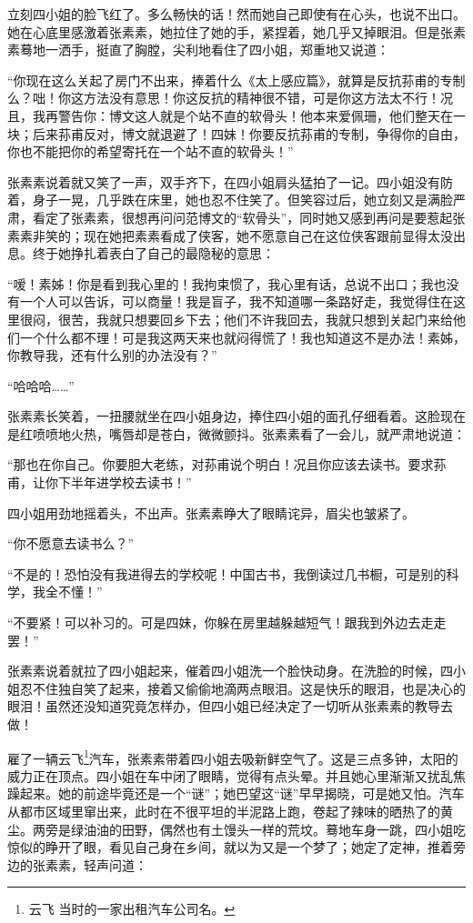 \par 立刻四小姐的脸飞红了。多么畅快的话！然而她自己即使有在心头，也说不出口。她在心底里感激着张素素，她拉住了她的手，紧捏着，她几乎又掉眼泪。但是张素素蓦地一洒手，挺直了胸膛，尖利地看住了四小姐，郑重地又说道：
\par “你现在这么关起了房门不出来，捧着什么《太上感应篇》，就算是反抗荪甫的专制么？咄！你这方法没有意思！你这反抗的精神很不错，可是你这方法太不行！况且，我再警告你：博文这人就是个站不直的软骨头！他本来爱佩珊，他们整天在一块；后来荪甫反对，博文就退避了！四妹！你要反抗荪甫的专制，争得你的自由，你也不能把你的希望寄托在一个站不直的软骨头！”
\par 张素素说着就又笑了一声，双手齐下，在四小姐肩头猛拍了一记。四小姐没有防着，身子一晃，几乎跌在床里，她也忍不住笑了。但笑容过后，她立刻又是满脸严肃，看定了张素素，很想再问问范博文的“软骨头”，同时她又感到再问是要惹起张素素非笑的；现在她把素素看成了侠客，她不愿意自己在这位侠客跟前显得太没出息。终于她挣扎着表白了自己的最隐秘的意思：
\par “嗳！素姊！你是看到我心里的！我拘束惯了，我心里有话，总说不出口；我也没有一个人可以告诉，可以商量！我是盲子，我不知道哪一条路好走，我觉得住在这里很闷，很苦，我就只想要回乡下去；他们不许我回去，我就只想到关起门来给他们一个什么都不理！可是我这两天来也就闷得慌了！我也知道这不是办法！素姊，你教导我，还有什么别的办法没有？”
\par “哈哈哈……”
\par 张素素长笑着，一扭腰就坐在四小姐身边，捧住四小姐的面孔仔细看着。这脸现在是红喷喷地火热，嘴唇却是苍白，微微颤抖。张素素看了一会儿，就严肃地说道：
\par “那也在你自己。你要胆大老练，对荪甫说个明白！况且你应该去读书。要求荪甫，让你下半年进学校去读书！”
\par 四小姐用劲地摇着头，不出声。张素素睁大了眼睛诧异，眉尖也皱紧了。
\par “你不愿意去读书么？”
\par “不是的！恐怕没有我进得去的学校呢！中国古书，我倒读过几书橱，可是别的科学，我全不懂！”
\par “不要紧！可以补习的。可是四妹，你躲在房里越躲越短气！跟我到外边去走走罢！”
\par 张素素说着就拉了四小姐起来，催着四小姐洗一个脸快动身。在洗脸的时候，四小姐忍不住独自笑了起来，接着又偷偷地滴两点眼泪。这是快乐的眼泪，也是决心的眼泪！虽然还没知道究竟怎样办，但四小姐已经决定了一切听从张素素的教导去做！
\par 雇了一辆云飞\footnote{云飞 当时的一家出租汽车公司名。}汽车，张素素带着四小姐去吸新鲜空气了。这是三点多钟，太阳的威力正在顶点。四小姐在车中闭了眼睛，觉得有点头晕。并且她心里渐渐又扰乱焦躁起来。她的前途毕竟还是一个“谜”；她巴望这“谜”早早揭晓，可是她又怕。汽车从都市区域里窜出来，此时在不很平坦的半泥路上跑，卷起了辣味的晒热了的黄尘。两旁是绿油油的田野，偶然也有土馒头一样的荒坟。蓦地车身一跳，四小姐吃惊似的睁开了眼，看见自己身在乡间，就以为又是一个梦了；她定了定神，推着旁边的张素素，轻声问道：

